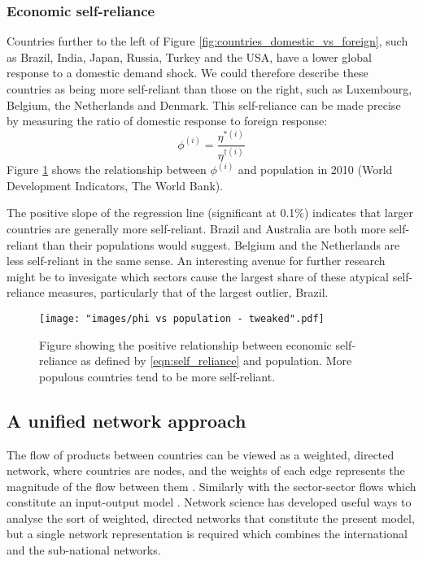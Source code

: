\documentclass{article}
\begin{document}
\subsubsection*{Economic self-reliance}
Countries further to the left of Figure \ref{fig:countries_domestic_vs_foreign}, such as Brazil, India, Japan, Russia, Turkey and the USA, have a lower global response to a domestic demand shock.
We could therefore describe these countries as being more self-reliant than those on the right, such as Luxembourg, Belgium, the Netherlands and Denmark.
This self-reliance can be made precise by measuring the ratio of domestic response to foreign response:
\begin{equation}\label{eqn:self_reliance}
\phi^{(i)} = \frac{\eta^{*(i)}}{\eta^{\dagger(i)}}
\end{equation}
Figure \ref{fig:phi-vs-pop} shows the relationship between $\phi^{(i)}$ and population in 2010 (World Development Indicators, The World Bank).

The positive slope of the regression line (significant at 0.1\%) indicates that larger countries are generally more self-reliant.
Brazil and Australia are both more self-reliant than their populations would suggest.
Belgium and the Netherlands are less self-reliant in the same sense.
An interesting avenue for further research might be to invesigate which sectors cause the largest share of these atypical self-reliance measures, particularly that of the largest outlier, Brazil.

\begin{figure}[tb]
\centering
\texttt{[image: "images/phi vs population - tweaked".pdf]}
\caption{Figure showing the positive relationship between economic self-reliance as defined by \cref{eqn:self_reliance} and population. More populous countries tend to be more self-reliant.}
\label{fig:phi-vs-pop}
\end{figure}

\subsection{A unified network approach}\label{sec:networkapproach}
The flow of products between countries can be viewed as a weighted, directed network, where countries are nodes, and the weights of each edge represents the magnitude of the flow between them \parencite{nystuen_graph_1961,serrano_topology_2003,bhattacharya_international_2008,baskaran_heckscher-ohlin_2011}.
Similarly with the sector-sector flows which constitute an input-output model \parencite{blochl_vertex_2011,fedriani_simplifying_2012}.
Network science has developed useful ways to analyse the sort of weighted, directed networks that constitute the present model, but a single network representation is required which combines the international and the sub-national networks.
\end{document}
